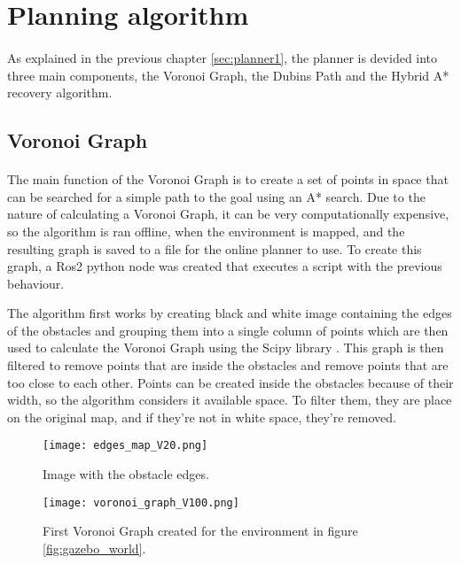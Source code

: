 \section{Planning algorithm}
\label{sec:planning_algorithm}

\paragraph{}As explained in the previous chapter \ref{sec:planner1}, 
the planner is devided into three main components, the Voronoi Graph, the Dubins Path and the Hybrid A* recovery algorithm.

\subsection{Voronoi Graph}
\label{subsec:voronoi_graph}

\paragraph{}The main function of the Voronoi Graph is to create a set of points in space that can be searched for a  
simple path to the goal using an A* search. Due to the nature of calculating a Voronoi Graph, it can be very computationally 
expensive, so the algorithm is ran offline, when the environment is mapped, and the resulting graph is saved to a 
file for the online planner to use. To create this graph, a Ros2 python node was created that executes a script with 
the previous behaviour.

The algorithm first works by creating black and white image containing the edges of the obstacles and grouping them 
into a single column of points which are then used to calculate the Voronoi Graph using the 
Scipy library \cite{Scipy}. 
This graph is then filtered to remove points that are inside the obstacles and remove points that are too close to each other. Points can be created inside the obstacles 
because of their width, so the algorithm considers it available space. To filter them, they are 
place on the original map, and  if they're not in white space, they're removed.
\begin{figure}[h]
    \centering
    \texttt{[image: edges\_map\_V20.png]}
    \caption{Image with the obstacle edges.}
    \label{fig:voronoi_edges}
\end{figure}
\begin{figure}[h]
    \centering
    \texttt{[image: voronoi\_graph\_V100.png]}
    \caption{First Voronoi Graph created for the environment in figure \ref{fig:gazebo_world}.}
    \label{fig:voronoi_graph1}
\end{figure}

